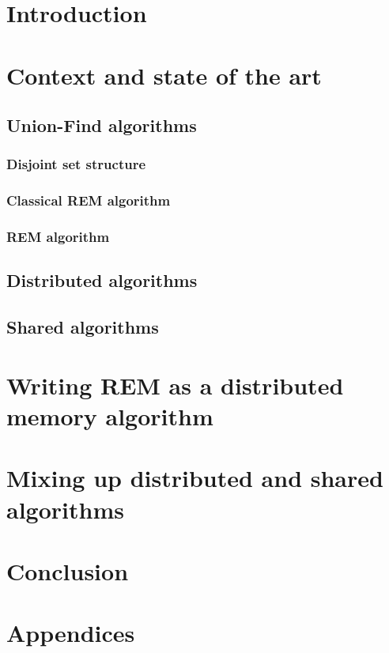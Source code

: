 \documentclass[12px]{article}
\begin{document}
  \section{Introduction}

  \section{Context and state of the art}
    \subsection{Union-Find algorithms}
      \subsubsection{Disjoint set structure}
      \subsubsection{Classical REM algorithm}
      \subsubsection{REM algorithm}

    \subsection{Distributed algorithms}

    \subsection{Shared algorithms}


  \section{Writing REM as a distributed memory algorithm}


  \section{Mixing up distributed and shared algorithms}


  \section{Conclusion}


  \section{Appendices}


  
  
\end{document}

